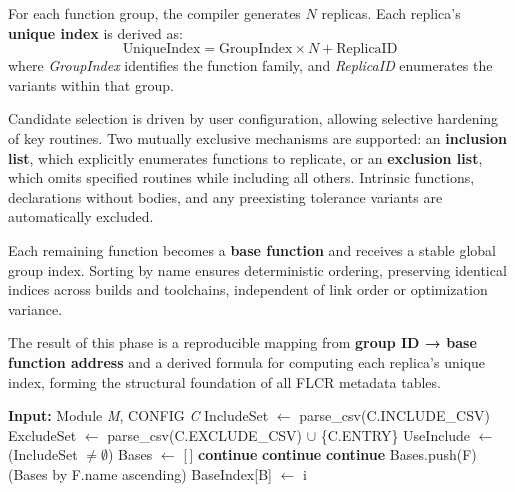 For each function group, the compiler generates \(N\) replicas.
Each replica’s \textbf{unique index} is derived as:
\[
\text{UniqueIndex} = \text{GroupIndex} \times N + \text{ReplicaID}
\]
where \textit{GroupIndex} identifies the function family,
and \textit{ReplicaID} enumerates the variants within that group.

Candidate selection is driven by user configuration, allowing selective hardening of key routines.
Two mutually exclusive mechanisms are supported:
an \textbf{inclusion list}, which explicitly enumerates functions to replicate,
or an \textbf{exclusion list}, which omits specified routines while including all others.
Intrinsic functions, declarations without bodies, and any preexisting tolerance variants
are automatically excluded.

Each remaining function becomes a \textbf{base function} and receives a stable global group index.
Sorting by name ensures deterministic ordering, preserving identical indices across builds
and toolchains, independent of link order or optimization variance.

The result of this phase is a reproducible mapping from
\textbf{group ID → base function address} and a derived formula for computing
each replica’s unique index, forming the structural foundation of all FLCR metadata tables.

\begin{algorithm}[H]
\caption{Phase B — Collect Base Functions}
\label{alg:phaseB}
\begin{algorithmic}[1]
\State \textbf{Input:} Module \textit{M}, CONFIG \textit{C}
\State IncludeSet $\gets$ parse\_csv(C.INCLUDE\_CSV)
\State ExcludeSet $\gets$ parse\_csv(C.EXCLUDE\_CSV) $\cup$ \{C.ENTRY\}
\State UseInclude $\gets$ (IncludeSet $\neq \emptyset$)
\State Bases $\gets$ [\,]
   \State \textbf{continue} \EndIf
   \State \textbf{continue} \EndIf
   \State \textbf{continue} \EndIf
  \State Bases.push(F)
\EndFor
\State {}(Bases by F.name ascending)
 \State BaseIndex[B] $\gets$ i \EndFor
\end{algorithmic}
\end{algorithm}
\clearpage


